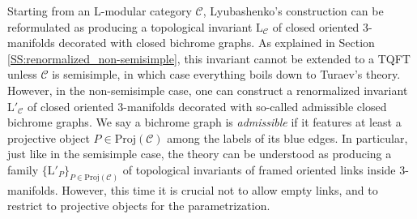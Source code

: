 \documentclass[a4paper,reqno]{amsart}
\theoremstyle{definition}
\theoremstyle{remark}
\newcommand{\rmL}{\mathrm{L}}
\newcommand{\calC}{\mathcal{C}}
\newcommand{\Proj}{\mathrm{Proj}}
\begin{document}
Starting from an L-modular category $\calC$, Lyubashenko's construction can be reformulated as producing a topological invariant $\rmL_\calC$ of closed oriented 3-manifolds decorated with closed bichrome graphs. As explained in Section \ref{SS:renormalized_non-semisimple}, this invariant cannot be extended to a TQFT unless $\calC$ is semisimple, in which case everything boils down to Turaev's theory. However, in the non-semisimple case, one can construct a renormalized invariant $\rmL'_\calC$ of closed oriented 3-manifolds decorated with so-called admissible closed bichrome graphs. We say a bichrome graph is \textit{admissible} if it features at least a projective object $P \in \Proj(\calC)$ among the labels of its blue edges. In particular, just like in the semisimple case, the theory can be understood as producing a family $\{ \rmL'_P \}_{P \in \Proj(\calC)}$ of topological invariants of framed oriented links inside 3-manifolds. However, this time it is crucial not to allow empty links, and to restrict to projective objects for the parametrization.
\end{document}
